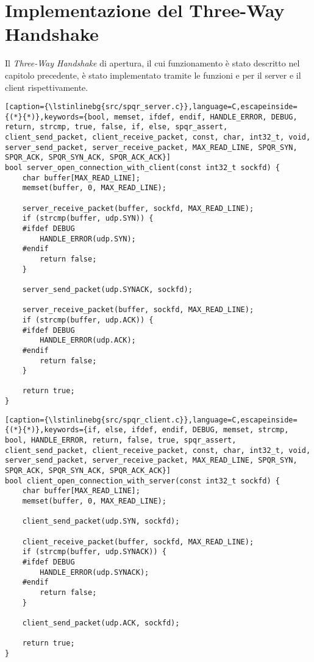 \section{Implementazione del Three-Way Handshake}
Il \textit{Three-Way Handshake} di apertura, il cui funzionamento è stato descritto nel capitolo precedente, è stato implementato tramite le funzioni  e  per il server e il client rispettivamente.

\begin{lstlisting}[caption={\lstinlinebg{src/spqr_server.c}},language=C,escapeinside={(*}{*)},keywords={bool, memset, ifdef, endif, HANDLE_ERROR, DEBUG, return, strcmp, true, false, if, else, spqr_assert, client_send_packet, client_receive_packet, const, char, int32_t, void, server_send_packet, server_receive_packet, MAX_READ_LINE, SPQR_SYN, SPQR_ACK, SPQR_SYN_ACK, SPQR_ACK_ACK}]
bool server_open_connection_with_client(const int32_t sockfd) {
    char buffer[MAX_READ_LINE];
    memset(buffer, 0, MAX_READ_LINE);

    server_receive_packet(buffer, sockfd, MAX_READ_LINE);
    if (strcmp(buffer, udp.SYN)) {
    #ifdef DEBUG
        HANDLE_ERROR(udp.SYN);
    #endif
        return false;
    }

    server_send_packet(udp.SYNACK, sockfd);

    server_receive_packet(buffer, sockfd, MAX_READ_LINE);
    if (strcmp(buffer, udp.ACK)) {
    #ifdef DEBUG
        HANDLE_ERROR(udp.ACK);
    #endif
        return false;
    }

    return true;
}
\end{lstlisting}

\begin{lstlisting}[caption={\lstinlinebg{src/spqr_client.c}},language=C,escapeinside={(*}{*)},keywords={if, else, ifdef, endif, DEBUG, memset, strcmp, bool, HANDLE_ERROR, return, false, true, spqr_assert, client_send_packet, client_receive_packet, const, char, int32_t, void, server_send_packet, server_receive_packet, MAX_READ_LINE, SPQR_SYN, SPQR_ACK, SPQR_SYN_ACK, SPQR_ACK_ACK}]
bool client_open_connection_with_server(const int32_t sockfd) {
    char buffer[MAX_READ_LINE];
    memset(buffer, 0, MAX_READ_LINE);

    client_send_packet(udp.SYN, sockfd);

    client_receive_packet(buffer, sockfd, MAX_READ_LINE);
    if (strcmp(buffer, udp.SYNACK)) {
    #ifdef DEBUG
        HANDLE_ERROR(udp.SYNACK);
    #endif
        return false;
    }

    client_send_packet(udp.ACK, sockfd);
    
    return true;
}
\end{lstlisting}


